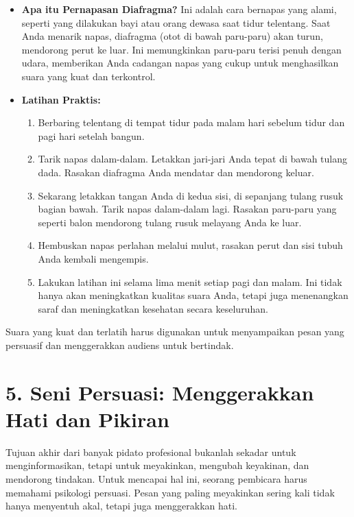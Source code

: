 \documentclass[
  letterpaper,
  DIV=11,
  numbers=noendperiod]{scrreprt}
\begin{document}
\begin{itemize}
\item
  \textbf{Apa itu Pernapasan Diafragma?} Ini adalah cara bernapas yang
  alami, seperti yang dilakukan bayi atau orang dewasa saat tidur
  telentang. Saat Anda menarik napas, diafragma (otot di bawah
  paru-paru) akan turun, mendorong perut ke luar. Ini memungkinkan
  paru-paru terisi penuh dengan udara, memberikan Anda cadangan napas
  yang cukup untuk menghasilkan suara yang kuat dan terkontrol.
\item
  \textbf{Latihan Praktis:}

  \begin{enumerate}
  \def\labelenumi{\arabic{enumi}.}
  \item
    Berbaring telentang di tempat tidur pada malam hari sebelum tidur
    dan pagi hari setelah bangun.
  \item
    Tarik napas dalam-dalam. Letakkan jari-jari Anda tepat di bawah
    tulang dada. Rasakan diafragma Anda mendatar dan mendorong keluar.
  \item
    Sekarang letakkan tangan Anda di kedua sisi, di sepanjang tulang
    rusuk bagian bawah. Tarik napas dalam-dalam lagi. Rasakan paru-paru
    yang seperti balon mendorong tulang rusuk melayang Anda ke luar.
  \item
    Hembuskan napas perlahan melalui mulut, rasakan perut dan sisi tubuh
    Anda kembali mengempis.
  \item
    Lakukan latihan ini selama lima menit setiap pagi dan malam. Ini
    tidak hanya akan meningkatkan kualitas suara Anda, tetapi juga
    menenangkan saraf dan meningkatkan kesehatan secara keseluruhan.
  \end{enumerate}
\end{itemize}

Suara yang kuat dan terlatih harus digunakan untuk menyampaikan pesan
yang persuasif dan menggerakkan audiens untuk bertindak.


\chapter{5. Seni Persuasi: Menggerakkan Hati dan
Pikiran}\label{seni-persuasi-menggerakkan-hati-dan-pikiran}

Tujuan akhir dari banyak pidato profesional bukanlah sekadar untuk
menginformasikan, tetapi untuk meyakinkan, mengubah keyakinan, dan
mendorong tindakan. Untuk mencapai hal ini, seorang pembicara harus
memahami psikologi persuasi. Pesan yang paling meyakinkan sering kali
tidak hanya menyentuh akal, tetapi juga menggerakkan hati.
\end{document}
